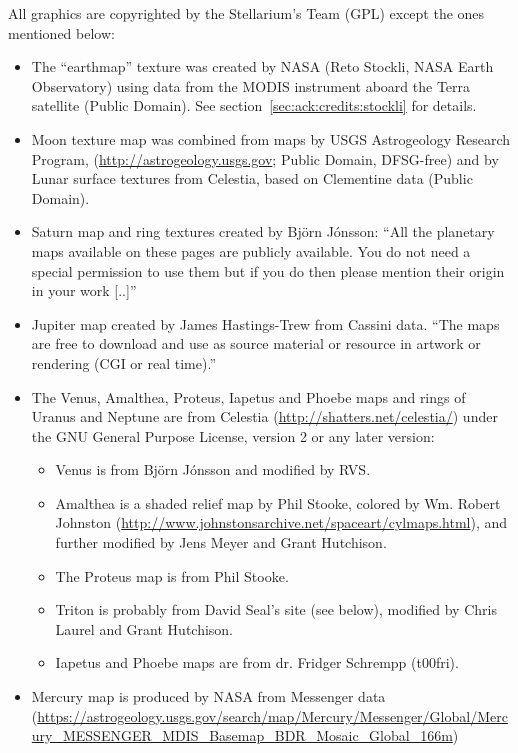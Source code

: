 All graphics are copyrighted by the Stellarium's Team (GPL) except the ones mentioned below:
\begin{itemize}		
\item The ``earthmap'' texture was created by NASA (Reto Stockli, NASA Earth
	  Observatory) using data from the MODIS instrument aboard the
	  Terra satellite (Public Domain). See section~\ref{sec:ack:credits:stockli} for details.
\item Moon texture map was combined from maps by USGS Astrogeology Research Program,
	  (\url{http://astrogeology.usgs.gov}; Public Domain, DFSG-free) and by Lunar
	  surface textures from Celestia, based on Clementine data (Public Domain).
\item Saturn map and ring textures created by Björn Jónsson:
	  ``All the planetary maps available on these pages are publicly
	  available. You do not need a special permission to use them but if
	  you do then please mention their origin in your work [..]''
\item Jupiter map created by James Hastings-Trew from Cassini data. ``The 
	  maps are free to download and use as source material or resource
	  in artwork or rendering (CGI or real time).''
\item The Venus, Amalthea, Proteus, Iapetus and Phoebe maps and rings of Uranus and Neptune are from Celestia (\url{http://shatters.net/celestia/})
	  under the GNU General Purpose License, version 2 or any later version:
	  \begin{itemize}
	     \item Venus is from Björn Jónsson and modified by RVS.
	     \item Amalthea is a shaded relief map by Phil Stooke, colored by Wm. Robert Johnston 
	       (\url{http://www.johnstonsarchive.net/spaceart/cylmaps.html}),
	       and further modified by Jens Meyer and Grant Hutchison.
	     \item The Proteus map is from Phil Stooke.
	     \item Triton is probably from David Seal's site (see below), modified by Chris Laurel and Grant Hutchison.
	     \item Iapetus and Phoebe maps are from dr. Fridger Schrempp (t00fri).
	  \end{itemize}
\item Mercury map is produced by NASA from Messenger data
	  (\url{https://astrogeology.usgs.gov/search/map/Mercury/Messenger/Global/Mercury_MESSENGER_MDIS_Basemap_BDR_Mosaic_Global_166m})

\end{itemize}
